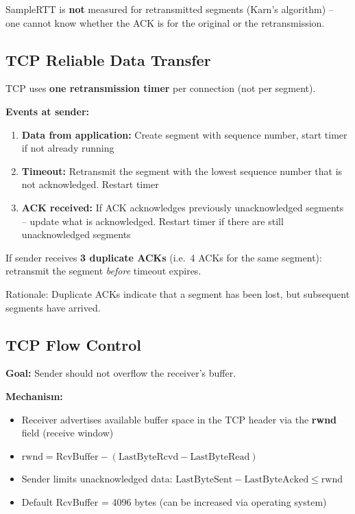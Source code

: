 \begin{warnbox}
SampleRTT is \textbf{not} measured for retransmitted segments (Karn's algorithm) -- one cannot know whether the ACK is for the original or the retransmission.
\end{warnbox}

\subsection{TCP Reliable Data Transfer}

\begin{keybox}
TCP uses \textbf{one retransmission timer} per connection (not per segment).

\textbf{Events at sender:}
\begin{enumerate}[noitemsep]
    \item \textbf{Data from application:} Create segment with sequence number, start timer if not already running
    \item \textbf{Timeout:} Retransmit the segment with the lowest sequence number that is not acknowledged. Restart timer
    \item \textbf{ACK received:} If ACK acknowledges previously unacknowledged segments -- update what is acknowledged. Restart timer if there are still unacknowledged segments
\end{enumerate}
\end{keybox}

\begin{keybox}
If sender receives \textbf{3 duplicate ACKs} (i.e.\ 4 ACKs for the same segment): retransmit the segment \emph{before} timeout expires.

Rationale: Duplicate ACKs indicate that a segment has been lost, but subsequent segments have arrived.
\end{keybox}

\subsection{TCP Flow Control}

\begin{keybox}
\textbf{Goal:} Sender should not overflow the receiver's buffer.

\textbf{Mechanism:}
\begin{itemize}[noitemsep]
    \item Receiver advertises available buffer space in the TCP header via the \textbf{rwnd} field (receive window)
    \item $\text{rwnd} = \text{RcvBuffer} - (\text{LastByteRcvd} - \text{LastByteRead})$
    \item Sender limits unacknowledged data: $\text{LastByteSent} - \text{LastByteAcked} \leq \text{rwnd}$
    \item Default RcvBuffer = 4096 bytes (can be increased via operating system)
\end{itemize}
\end{keybox}

